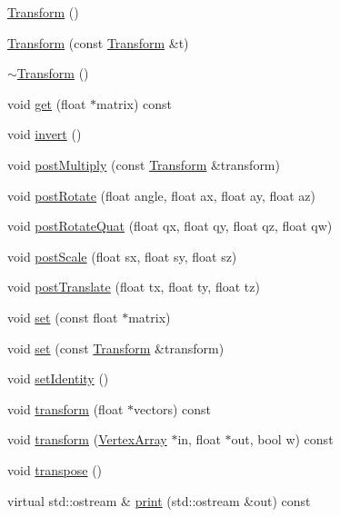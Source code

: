 \begin{CompactItemize}
\item 
\hyperlink{classm3g_1_1Transform_9de68ec1c9b7809129814a3233ae4655}{Transform} ()
\item 
\hyperlink{classm3g_1_1Transform_6f8c18ec2bd6b5c0d7f3472752ec79d1}{Transform} (const \hyperlink{classm3g_1_1Transform}{Transform} \&t)
\item 
\hyperlink{classm3g_1_1Transform_8e627263611a76aad02c9e0b89287c68}{$\sim$Transform} ()
\item 
void \hyperlink{classm3g_1_1Transform_f78faf7dcc06f53604ad08965babb7b3}{get} (float $\ast$matrix) const 
\item 
void \hyperlink{classm3g_1_1Transform_7fa1616cc61c19a5efcc863c950f7f30}{invert} ()
\item 
void \hyperlink{classm3g_1_1Transform_ad6083d90dbecc7e5bb39d5062723a0d}{postMultiply} (const \hyperlink{classm3g_1_1Transform}{Transform} \&transform)
\item 
void \hyperlink{classm3g_1_1Transform_4abf135257f132cdf9580f3a3e11ea6c}{postRotate} (float angle, float ax, float ay, float az)
\item 
void \hyperlink{classm3g_1_1Transform_7ce6ca00ac17bc4bb5f271c48da5e2dc}{postRotateQuat} (float qx, float qy, float qz, float qw)
\item 
void \hyperlink{classm3g_1_1Transform_4cbb4aa3878b658da54a144896f71446}{postScale} (float sx, float sy, float sz)
\item 
void \hyperlink{classm3g_1_1Transform_638498b811d6ccdf60b7f1f3de157ed6}{postTranslate} (float tx, float ty, float tz)
\item 
void \hyperlink{classm3g_1_1Transform_d1a2203142a848286c80d66c8c7fa37d}{set} (const float $\ast$matrix)
\item 
void \hyperlink{classm3g_1_1Transform_8926ff19517a76de8f938025e9d3163d}{set} (const \hyperlink{classm3g_1_1Transform}{Transform} \&transform)
\item 
void \hyperlink{classm3g_1_1Transform_382e6ad7e6721b121e510959e1011be3}{setIdentity} ()
\item 
void \hyperlink{classm3g_1_1Transform_0b85978885624f651df63da4137692df}{transform} (float $\ast$vectors) const 
\item 
void \hyperlink{classm3g_1_1Transform_557e326db393b8a1ce23455978af32dc}{transform} (\hyperlink{classm3g_1_1VertexArray}{VertexArray} $\ast$in, float $\ast$out, bool w) const 
\item 
void \hyperlink{classm3g_1_1Transform_f3a99ffb20127be48232d12260e934dc}{transpose} ()
\item 
virtual std::ostream \& \hyperlink{classm3g_1_1Transform_6fea17fa1532df3794f8cb39cb4f911f}{print} (std::ostream \&out) const 
\end{CompactItemize}


